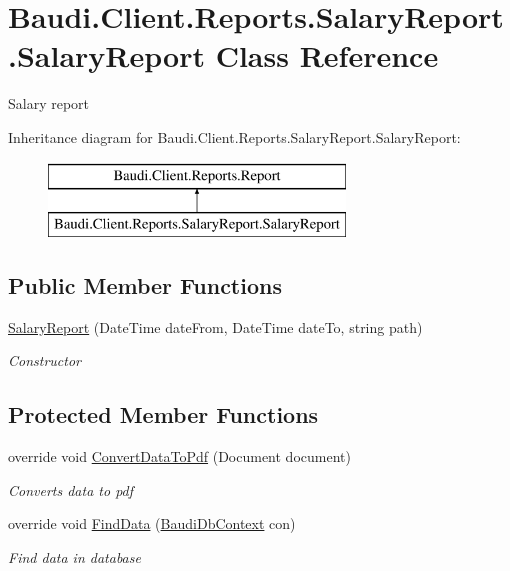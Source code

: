 \hypertarget{class_baudi_1_1_client_1_1_reports_1_1_salary_report_1_1_salary_report}{}\section{Baudi.\+Client.\+Reports.\+Salary\+Report.\+Salary\+Report Class Reference}
\label{class_baudi_1_1_client_1_1_reports_1_1_salary_report_1_1_salary_report}


Salary report  


Inheritance diagram for Baudi.\+Client.\+Reports.\+Salary\+Report.\+Salary\+Report\+:\begin{figure}[H]
\begin{center}
\leavevmode
\includegraphics[height=2.000000cm]{class_baudi_1_1_client_1_1_reports_1_1_salary_report_1_1_salary_report}
\end{center}
\end{figure}
\subsection*{Public Member Functions}
\begin{DoxyCompactItemize}
\item 
\hyperlink{class_baudi_1_1_client_1_1_reports_1_1_salary_report_1_1_salary_report_a05d3c08ada11967d0280f9e282798220}{Salary\+Report} (Date\+Time date\+From, Date\+Time date\+To, string path)
\begin{DoxyCompactList}\small\item\em Constructor \end{DoxyCompactList}\end{DoxyCompactItemize}
\subsection*{Protected Member Functions}
\begin{DoxyCompactItemize}
\item 
override void \hyperlink{class_baudi_1_1_client_1_1_reports_1_1_salary_report_1_1_salary_report_a66ca67406d236a9622c380159557fb80}{Convert\+Data\+To\+Pdf} (Document document)
\begin{DoxyCompactList}\small\item\em Converts data to pdf \end{DoxyCompactList}\item 
override void \hyperlink{class_baudi_1_1_client_1_1_reports_1_1_salary_report_1_1_salary_report_a4c5a47ccb30cd1571bc9fb92194e237a}{Find\+Data} (\hyperlink{class_baudi_1_1_d_a_l_1_1_baudi_db_context}{Baudi\+Db\+Context} con)
\begin{DoxyCompactList}\small\item\em Find data in database \end{DoxyCompactList}\end{DoxyCompactItemize}
